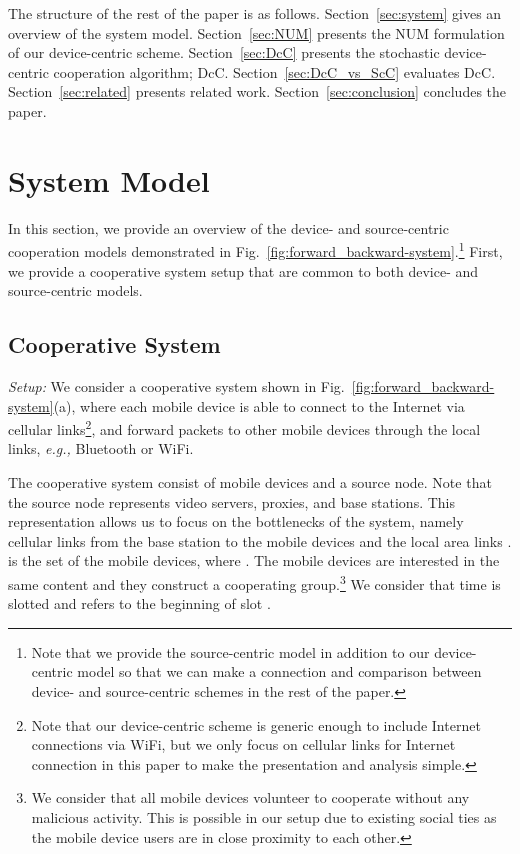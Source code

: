 \documentclass[conference]{IEEEtran}
\newcommand{\eg}{{\em e.g., }}
\begin{document}
The structure of the rest of the paper is as follows. Section~\ref{sec:system} gives an overview of the system model. Section~\ref{sec:NUM} presents the NUM formulation of our device-centric scheme. Section~\ref{sec:DcC} presents the stochastic device-centric cooperation algorithm; DcC. Section~\ref{sec:DcC_vs_ScC} evaluates DcC. Section~\ref{sec:related} presents related work. Section~\ref{sec:conclusion} concludes the paper.


\section{\label{sec:system}System Model}
In this section, we provide an overview of the device- and source-centric cooperation models demonstrated in Fig.~\ref{fig:forward_backward-system}.\footnote{Note that we provide the source-centric model in addition to our device-centric model so that we can make a connection and comparison between device- and source-centric schemes in the rest of the paper.} First, we provide a cooperative system setup that are common to both device- and source-centric models.

\subsection{Cooperative System}
{\em Setup:} We consider a cooperative system shown in Fig.~\ref{fig:forward_backward-system}(a), where each mobile device is able to connect to the Internet via cellular links\footnote{Note that our device-centric scheme is generic enough to include Internet connections via WiFi, but we only focus on cellular links for Internet connection in this paper to make the presentation and analysis simple.}, and forward packets to other mobile devices through the local links, \eg Bluetooth or WiFi.

The cooperative system consist of  mobile devices and a source node. Note that the source node represents video servers, proxies, and base stations. This representation allows us to focus on the bottlenecks of the system, namely cellular links from the base station to the mobile devices and the local area links \cite{microcast_allerton}.  is the set of the mobile devices, where . The mobile devices are interested in the same content and they construct a cooperating group.\footnote{We consider that all mobile devices volunteer to cooperate without any malicious activity. This is possible in our setup due to existing social ties as the mobile device users are in close proximity to each other.}
We consider that time is slotted and  refers to the beginning of slot .
\end{document}
